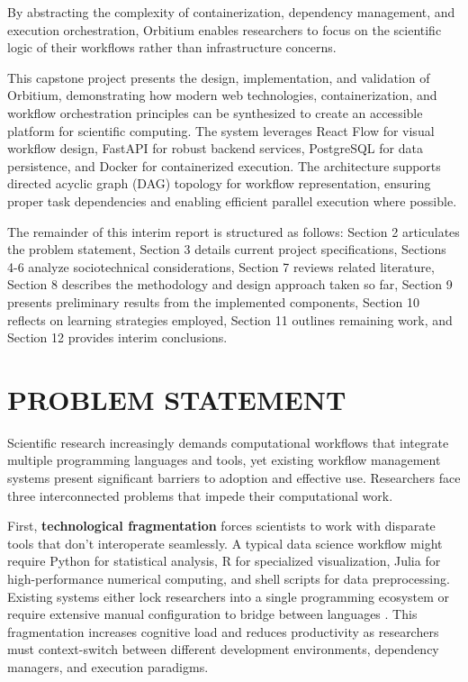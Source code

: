\documentclass[12pt]{article}
\begin{document}
\hspace{\parindent}By abstracting the complexity of containerization, dependency management, and execution orchestration, Orbitium enables researchers to focus on the scientific logic of their workflows rather than infrastructure concerns.

\hspace{\parindent}This capstone project presents the design, implementation, and validation of Orbitium, demonstrating how modern web technologies, containerization, and workflow orchestration principles can be synthesized to create an accessible platform for scientific computing. The system leverages React Flow for visual workflow design, FastAPI for robust backend services, PostgreSQL for data persistence, and Docker for containerized execution. The architecture supports directed acyclic graph (DAG) topology for workflow representation, ensuring proper task dependencies and enabling efficient parallel execution where possible.

\hspace{\parindent}The remainder of this interim report is structured as follows: Section 2 articulates the problem statement, Section 3 details current project specifications, Sections 4-6 analyze sociotechnical considerations, Section 7 reviews related literature, Section 8 describes the methodology and design approach taken so far, Section 9 presents preliminary results from the implemented components, Section 10 reflects on learning strategies employed, Section 11 outlines remaining work, and Section 12 provides interim conclusions.

\newpage
\section{PROBLEM STATEMENT}

\hspace{\parindent}Scientific research increasingly demands computational workflows that integrate multiple programming languages and tools, yet existing workflow management systems present significant barriers to adoption and effective use. Researchers face three interconnected problems that impede their computational work.

\hspace{\parindent}First, \textbf{technological fragmentation} forces scientists to work with disparate tools that don't interoperate seamlessly. A typical data science workflow might require Python for statistical analysis, R for specialized visualization, Julia for high-performance numerical computing, and shell scripts for data preprocessing. Existing systems either lock researchers into a single programming ecosystem or require extensive manual configuration to bridge between languages \cite{perkel2019workflow}. This fragmentation increases cognitive load and reduces productivity as researchers must context-switch between different development environments, dependency managers, and execution paradigms.
\end{document}
